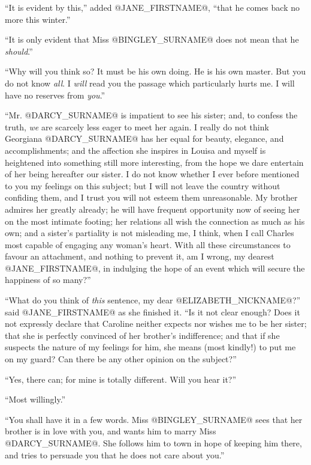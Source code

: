``It is evident by this,'' added @JANE_FIRSTNAME@, ``that he comes back no more this
winter.''

``It is only evident that Miss @BINGLEY_SURNAME@ does not mean that he \textit{should}.''

``Why will you think so? It must be his own doing. He is his own
master. But you do not know \textit{all}. I \textit{will} read you the passage which
particularly hurts me. I will have no reserves from \textit{you}.''

``Mr. @DARCY_SURNAME@ is impatient to see his sister; and, to confess the truth,
\textit{we} are scarcely less eager to meet her again. I really do not think
Georgiana @DARCY_SURNAME@ has her equal for beauty, elegance, and accomplishments;
and the affection she inspires in Louisa and myself is heightened into
something still more interesting, from the hope we dare entertain of
her being hereafter our sister. I do not know whether I ever before
mentioned to you my feelings on this subject; but I will not leave the
country without confiding them, and I trust you will not esteem them
unreasonable. My brother admires her greatly already; he will have
frequent opportunity now of seeing her on the most intimate footing;
her relations all wish the connection as much as his own; and a sister's
partiality is not misleading me, I think, when I call Charles most
capable of engaging any woman's heart. With all these circumstances to
favour an attachment, and nothing to prevent it, am I wrong, my dearest
@JANE_FIRSTNAME@, in indulging the hope of an event which will secure the happiness
of so many?''

``What do you think of \textit{this} sentence, my dear @ELIZABETH_NICKNAME@?'' said @JANE_FIRSTNAME@ as she
finished it. ``Is it not clear enough? Does it not expressly declare that
Caroline neither expects nor wishes me to be her sister; that she is
perfectly convinced of her brother's indifference; and that if she
suspects the nature of my feelings for him, she means (most kindly!) to
put me on my guard? Can there be any other opinion on the subject?''

``Yes, there can; for mine is totally different. Will you hear it?''

``Most willingly.''

``You shall have it in a few words. Miss @BINGLEY_SURNAME@ sees that her brother is
in love with you, and wants him to marry Miss @DARCY_SURNAME@. She follows him
to town in hope of keeping him there, and tries to persuade you that he
does not care about you.''

